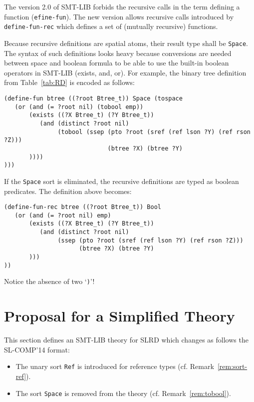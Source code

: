 \documentclass{llncs}
\begin{document}
\begin{remark}\label{rem:def-rec}
The version 2.0 of SMT-LIB forbids the recursive calls in the term defining a function 
(\texttt{efine-fun}). 
The new version allows recursive calls introduced by \texttt{define-fun-rec} which defines a set of (mutually recursive) functions.
\end{remark}

Because recursive definitions are spatial atoms, their result type shall be \texttt{Space}. 
The syntax of such definitions looks heavy because conversions are needed between space and boolean formula to be able to use the built-in boolean operators in SMT-LIB (exists, and, or).
For example, the binary tree definition from Table~\ref{tab:RD} is encoded as follows:
\begin{verbatim}
(define-fun btree ((?root Btree_t)) Space (tospace 
   (or (and (= ?root nil) (tobool emp))
       (exists ((?X Btree_t) (?Y Btree_t)) 
          (and (distinct ?root nil) 
               (tobool (ssep (pto ?root (sref (ref lson ?Y) (ref rson ?Z)))
                             (btree ?X) (btree ?Y)
       ))))
)))
\end{verbatim}

\begin{remark}\label{rem:def-rec-bool}
If the \texttt{Space} sort is eliminated, the recursive definitions are typed as boolean predicates. The definition above becomes:
\begin{verbatim}
(define-fun-rec btree ((?root Btree_t)) Bool
   (or (and (= ?root nil) emp)
       (exists ((?X Btree_t) (?Y Btree_t))
          (and (distinct ?root nil)  
               (ssep (pto ?root (sref (ref lson ?Y) (ref rson ?Z)))
                     (btree ?X) (btree ?Y)
       )))
))
\end{verbatim}
Notice the absence of two `\texttt{)}'!
\end{remark}



\section{Proposal for a Simplified Theory}
\label{sec:sl-v0}

This section defines an SMT-LIB theory for SLRD which changes as follows the SL-COMP'14 format:
\begin{itemize}
\item The unary sort \texttt{Ref} is introduced for reference types (cf. Remark~\ref{rem:sort-ref}).
\item The sort \texttt{Space} is removed from the theory (cf. Remark~\ref{rem:tobool}).
\end{itemize}
\end{document}
